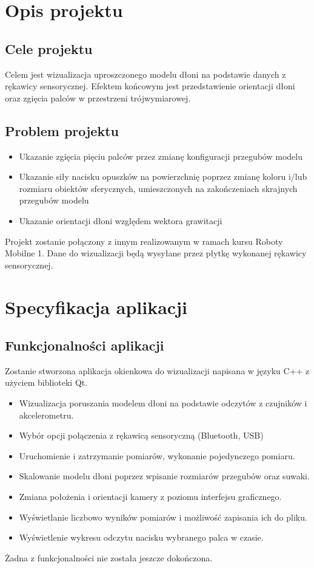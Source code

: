\documentclass[10pt,a4paper]{article}
\begin{document}
\section{Opis projektu} \normalsize
\subsection{Cele projektu}
Celem jest wizualizacja uproszczonego modelu dłoni na podstawie danych z rękawicy sensorycznej. 
Efektem końcowym jest przedstawienie orientacji dłoni oraz zgięcia palców w przestrzeni trójwymiarowej. \\

\subsection{Problem projektu}
\begin{itemize}
\item Ukazanie zgięcia pięciu palców przez zmianę konfiguracji przegubów modelu
\item Ukazanie siły nacisku opuszków na powierzchnię poprzez zmianę koloru i/lub rozmiaru obiektów sferycznych, umieszczonych na zakończeniach skrajnych przegubów modelu
\item Ukazanie orientacji dłoni względem wektora grawitacji
\end{itemize}

Projekt zostanie połączony z innym realizowanym w ramach kursu Roboty Mobilne 1. Dane do wizualizacji będą wysyłane przez płytkę wykonanej rękawicy sensorycznej.

\section{Specyfikacja aplikacji}

\subsection{Funkcjonalności aplikacji}
Zostanie stworzona aplikacja okienkowa do wizualizacji napisana w języku C++ z użyciem biblioteki Qt.\\
\begin{itemize}
\item Wizualizacja poruszania modelem dłoni na podstawie odczytów z czujników i akcelerometru.
\item Wybór opcji połączenia z rękawicą sensoryczną (Bluetooth, USB)
\item Uruchomienie i zatrzymanie pomiarów, wykonanie pojedynczego pomiaru.
\item Skalowanie modelu dłoni poprzez wpisanie rozmiarów przegubów oraz suwaki.
\item Zmiana położenia i orientacji kamery z poziomu interfejsu graficznego.
\item Wyświetlanie liczbowo wyników pomiarów i możliwość zapisania ich do pliku.
\item Wyświetlenie wykresu odczytu nacisku wybranego palca w czasie.
\end{itemize}
Żadna z funkcjonalności nie została jeszcze dokończona.
\end{document}
